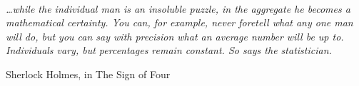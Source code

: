 





\listfiles

\makeindex


\prefrontmatter

\maketitlepage


\frontmatter



\tableofcontents
\listoffigures
\listoftables

\cleardoublepage
\thispagestyle{empty}
~\vfill
\begin{fullwidth}
\begin{doublespace}
	\noindent\fontsize{14}{16}\selectfont\itshape
	\nohyphenation
\ldots while the individual man is an insoluble puzzle, in the aggregate he becomes a mathematical certainty. You can, for example, never foretell what any one man will do, but you can say with precision what an average number will be up to. Individuals vary, but percentages remain constant. So says the statistician.
  \begin{flushright}
Sherlock Holmes, in The Sign of Four
  \end{flushright}
\end{doublespace}
\end{fullwidth}
\vfill
\vfill

\mainmatter

%






\appendix





\backmatter
%
%

\printbibliography[]

